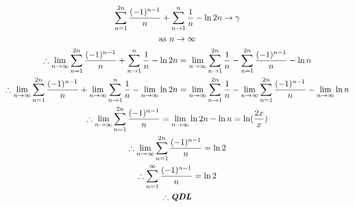 \documentclass{article}
\begin{document}
\begin{gather*}
\sum^{2n}_{n=1}\frac{(-1)^{n-1}}{n}+\sum^{n}_{n\to 1}\frac{1}{n}-\ln{2n}\to\gamma
\\\text{as }n\to\infty
\\\therefore \lim_{n\to\infty}\sum^{2n}_{n=1}\frac{(-1)^{n-1}}{n}+\sum^{n}_{n\to 1}\frac{1}{n}-\ln{2n}=\lim_{n\to\infty}\sum^{2n}_{n\to 1}\frac{1}{n}-\sum^{2n}_{n=1}\frac{(-1)^{n-1}}{n}-\ln{n}
\\\therefore \lim_{n\to\infty}\sum^{2n}_{n=1}\frac{(-1)^{n-1}}{n}+ \lim_{n\to\infty}\sum^{n}_{n\to 1}\frac{1}{n}- \lim_{n\to\infty}\ln{2n}=\lim_{n\to\infty}\sum^{2n}_{n\to 1}\frac{1}{n}- \lim_{n\to\infty}\sum^{2n}_{n=1}\frac{(-1)^{n-1}}{n}- \lim_{n\to\infty}\ln{n}
\\\therefore  \lim_{n\to\infty}\sum^{2n}_{n=1}\frac{(-1)^{n-1}}{n}=\lim_{n\to\infty}\ln{2n}-\ln{n}=\ln(\frac{2x}{x})
\\\therefore \lim_{n\to\infty}\sum^{2n}_{n=1}\frac{(-1)^{n-1}}{n}=\ln{2}
\\\therefore \sum^{\infty}_{n=1}\frac{(-1)^{n-1}}{n}=\ln{2}
\\\therefore \textbf{\textit{QDL}}
\end{gather*}
\end{document}
